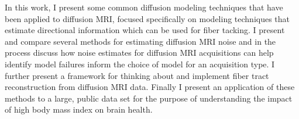In this work, I present some common diffusion modeling techniques that have been applied to diffusion MRI, focused specifically on modeling techniques that estimate directional information which can be used for fiber tacking. I present and compare several methods for estimating diffusion MRI noise and in the process discuss how noise estimates for diffusion MRI acquisitions can help identify model failures inform the choice of model for an acquisition type. I further present a framework for thinking about and implement fiber tract reconstruction from diffusion MRI data. Finally I present an application of these methods to a large, public data set for the purpose of understanding the impact of high body mass index on brain health. 
